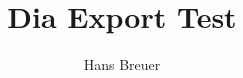 \documentclass[landscape]{article}
\title{Dia Export Test}
\author{Hans Breuer}
\begin{document}
\maketitle
\begin{center}



\end{center}
\end{document}
